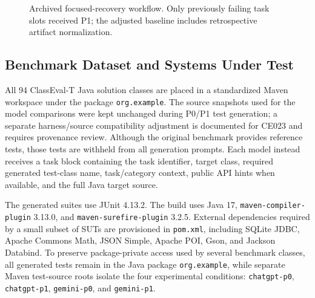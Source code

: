 \documentclass[conference]{IEEEtran}
\begin{document}
\begin{figure}[t]
\centering
{}
\caption{Archived focused-recovery workflow. Only previously failing task slots received P1; the adjusted baseline includes retrospective artifact normalization.}
\label{fig:workflow}
\end{figure}

\subsection{Benchmark Dataset and Systems Under Test}
All 94 ClassEval-T Java solution classes are placed in a standardized Maven workspace under the package \texttt{org.example}. The source snapshots used for the model comparisons were kept unchanged during P0/P1 test generation; a separate harness/source compatibility adjustment is documented for CE023 and requires provenance review. Although the original benchmark provides reference tests, those tests are withheld from all generation prompts. Each model instead receives a task block containing the task identifier, target class, required generated test-class name, task/category context, public API hints when available, and the full Java target source.

The generated suites use JUnit 4.13.2. The build uses Java 17, \texttt{maven-compiler-plugin} 3.13.0, and \texttt{maven-surefire-plugin} 3.2.5. External dependencies required by a small subset of SUTs are provisioned in \texttt{pom.xml}, including SQLite JDBC, Apache Commons Math, JSON Simple, Apache POI, Gson, and Jackson Databind. To preserve package-private access used by several benchmark classes, all generated tests remain in the Java package \texttt{org.example}, while separate Maven test-source roots isolate the four experimental conditions: \texttt{chatgpt-p0}, \texttt{chatgpt-p1}, \texttt{gemini-p0}, and \texttt{gemini-p1}.
\end{document}
